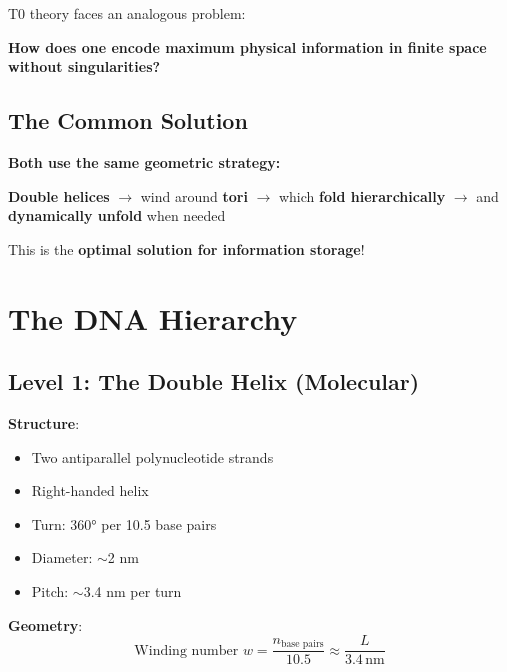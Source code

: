 	T0 theory faces an analogous problem:
	
	\begin{center}
		
		\textbf{How does one encode maximum physical information in finite space without singularities?}
	\end{center}
	
	\subsection{The Common Solution}
	
	\begin{keyresult}
		\textbf{Both use the same geometric strategy:}
		
		\vspace{0.3cm}
		
		\textbf{Double helices} $\to$ wind around \textbf{tori} $\to$ which \textbf{fold hierarchically} $\to$ and \textbf{dynamically unfold} when needed
		
		\vspace{0.3cm}
		
		This is the \textbf{optimal solution for information storage}!
	\end{keyresult}
	
	\section{The DNA Hierarchy}
	
	\subsection{Level 1: The Double Helix (Molecular)}
	
	\textbf{Structure}:
	\begin{itemize}
		\item Two antiparallel polynucleotide strands
		\item Right-handed helix
		\item Turn: 360° per 10.5 base pairs
		\item Diameter: $\sim$2 nm
		\item Pitch: $\sim$3.4 nm per turn
	\end{itemize}
	
	\textbf{Geometry}:
	\begin{equation}
		\text{Winding number } w = \frac{n_{\text{base pairs}}}{10.5} \approx \frac{L}{3.4\,\text{nm}}
	\end{equation}
	
